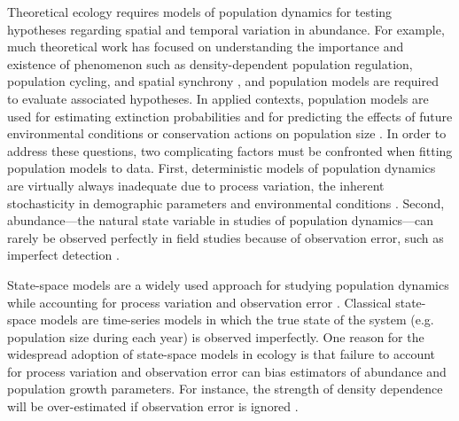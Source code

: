 \documentclass[12pt]{article}
\begin{document}

Theoretical ecology requires models of population dynamics for testing
hypotheses regarding spatial and temporal variation in
abundance. For example, much theoretical work has focused on
understanding the importance and existence of phenomenon such as
density-dependent population regulation, population cycling, and spatial synchrony
\citep{may:1975,turchin:1990,bjornstad_etal:1999}, %
and population models are required to evaluate associated hypotheses.
In applied contexts, population models are used for estimating extinction probabilities
\citep{schoener_spiller:1992,nadeem_lele:2011,hostetler_etal:2012} and for predicting the
effects of future environmental conditions or conservation actions on
population size \citep{jamieson_brooks:2004,hatfield_etal:2012}.
In order to address these questions, two complicating factors must
be confronted when fitting population models to data. 
First, deterministic models of population dynamics are virtually always inadequate due to process
variation, the inherent stochasticity in demographic parameters and environmental
conditions \citep{bjornstad_grenfell:2001,saether_engen:2002}.
Second, abundance---the natural state variable in studies
of population dynamics---can rarely be observed perfectly in field
studies because of observation error, such as imperfect
detection \citep{link_nichols:1994,kery_etal:2009}.

State-space models are a widely used approach for
studying population dynamics while accounting for process variation
and observation error \citep{devalpine_hastings:2002,
  buckland_etal:2004, dennis_etal:2006}. Classical state-space
models are time-series models in which the true state of the
system (e.g. population size during each year) is observed
imperfectly. One reason for the widespread adoption of
state-space models in ecology is that failure to account for process
variation and observation error can bias estimators of abundance and
population growth parameters. For instance, the strength of
density dependence will be over-estimated if observation error is
ignored \citep{link_nichols:1994,shenk_etal:1998}.
\end{document}
